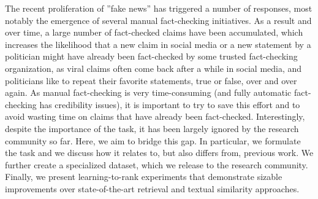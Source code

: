 The recent proliferation of ''fake news'' has triggered a number of responses, most notably the emergence of several manual fact-checking initiatives. As a result and over time, a large number of fact-checked claims have been accumulated, which increases the likelihood that a new claim in social media or a new statement by a politician might have already been fact-checked by some trusted fact-checking organization, as viral claims often come back after a while in social media, and politicians like to repeat their favorite statements, true or false, over and over again. As manual fact-checking is very time-consuming (and fully automatic fact-checking has credibility issues), it is important to try to save this effort and to avoid wasting time on claims that have already been fact-checked. Interestingly, despite the importance of the task, it has been largely ignored by the research community so far. Here, we aim to bridge this gap. In particular, we formulate the task and we discuss how it relates to, but also differs from, previous work. We further create a specialized dataset, which we release to the research community. Finally, we present learning-to-rank experiments that demonstrate sizable improvements over state-of-the-art retrieval and textual similarity approaches.
